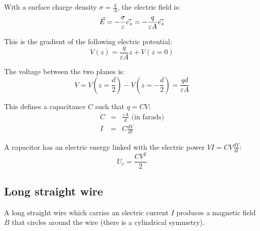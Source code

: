 \documentclass[a4paper,10pt]{article}
\newcommand{\vE}{\ensuremath\vec{E}} %
\begin{document}
With a surface charge density $\sigma = \frac{q}{A}$, the electric field is:
\begin{equation}
  \vE = -\frac{\sigma}{\varepsilon} \vec{e_z} = -\frac{q}{\varepsilon A} \vec{e_z}
\end{equation}

This is the gradient of the following electric potential:
\begin{equation}
  V(z) = \frac{q}{\varepsilon A} z + V(z=0)
\end{equation}

The voltage between the two planes is:
\begin{equation}
  V = V\left(z=\frac{d}{2}\right) - V\left(z=-\frac{d}{2}\right) = \frac{qd}{\varepsilon A}
\end{equation}

This defines a capacitance $C$ such that $q = CV$:
\begin{eqnarray}
  C &=& \frac{\varepsilon A}{d} \text{ (in farads)} \\
  I &=& C \frac{dV}{dt}
\end{eqnarray}

A capacitor has an electric energy linked with the electric power $VI = CV \frac{dV}{dt}$:
\begin{equation}
  U_e = \frac{CV^2}{2}
\end{equation}

\subsection{Long straight wire}

A long straight wire which carries an electric current $I$ produces a magnetic field $B$ that circles around the wire (there is a cylindrical symmetry).
\end{document}
